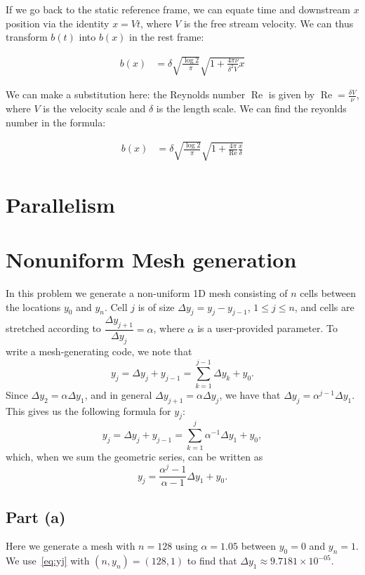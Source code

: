 \documentclass{article}
\DeclareMathOperator\Reynolds{Re}
\begin{document}
If we go back to the static reference frame, we can equate time and downstream
	$x$ position via the identity $x = V t$, where $V$ is the free
	stream velocity.
We can thus transform $b(t)$ into $b(x)$ in the rest frame:

\begin{align}
b(x) & = \delta \sqrt{\frac{\log 2}{\pi}} \sqrt{1 + \frac{4 \pi \nu}{\delta^2 V} x}
\end{align}

We can make a substitution here: the Reynolds number $\Reynolds$ is given by
	$\Reynolds = \frac{\delta V}{\nu}$, where $V$ is the velocity scale
	and $\delta$ is the length scale.
We can find the reyonlds number in the formula:

\begin{align}
b(x) & = \delta \sqrt{\frac{\log 2}{\pi}} 
	\sqrt{1 + \frac{4 \pi}{\Reynolds} \frac{x}{\delta}}
\end{align}

\section{Parallelism}

\section{ Nonuniform Mesh generation}

In this problem we generate a non-uniform 1D mesh consisting of $n$ cells between the locations $y_0$ and $y_n$. Cell $j$ is of size $\Delta y_j = y_j-y_{j-1}$, $ 1\leq j \leq n$, and cells are stretched according to $\dfrac{\Delta y_{j+1}}{\Delta y_j}  =\alpha$, where $\alpha$ is a user-provided parameter. To write a mesh-generating code, we note that 
\[ y_j  = \Delta y_j + y_{j-1} = \sum_{k=1}^{j-1} \Delta y_k + y_0.\]
Since $\Delta y_2 = \alpha \Delta y_1$, and in general $\Delta y_{j+1} = \alpha  \Delta y_{j}$, we have that $\Delta y_{j} = \alpha^{j-1} \Delta y_1$. This gives us the following formula for $y_j$:
\[ y_j  = \Delta y_j + y_{j-1} = \sum_{k=1}^{j} \alpha^{-1} \Delta y_1 + y_0, \]
which, when we sum the geometric series, can be written as 
\begin{equation}
\label{eq:yj}
 y_j = \dfrac{\alpha^{j}-1}{\alpha -1} \Delta y_1 +y_0. 
\end{equation}

\subsection{Part (a)}
Here we generate a mesh with $n=128$ using $ \alpha = 1.05$ between $y_0 = 0$ and $y_n = 1$.  We use~\eqref{eq:yj} with $(n, y_n) = (128, 1)$ to find that $ \Delta y_1 \approx 9.7181 \times 10^{-05} $.  
\end{document}
